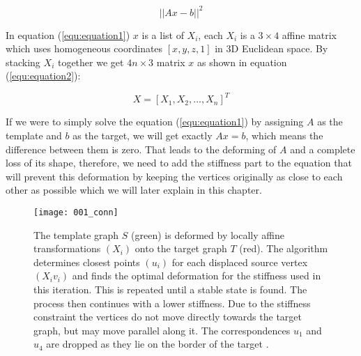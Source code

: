 \documentclass[../structure.tex]{subfiles}
\begin{document}
\begin{equation}
\label{equ:equation1}
||Ax-b||^2
\end{equation}

\hspace{2em}In equation (\ref{equ:equation1}) $x$ is a list of $X_i$, each $X_i$ is a $3\times4$ affine matrix which uses homogeneous coordinates $[x,y,z,1]$ in 3D Euclidean space. By stacking $X_i$ together we get $4n\times3$ matrix $x$ as shown in equation (\ref{equ:equation2}):

\begin{equation}
\label{equ:equation2}
X = [X_1, X_2, ... ,X_n]^T
\end{equation}

If we were to simply solve the equation (\ref{equ:equation1}) by assigning $A$ as the template and $b$ as the target, we will get exactly $Ax=b$, which means the difference between them is zero. That leads to the deforming of $A$ and a complete loss of its shape, therefore, we need to add the stiffness part to the equation that will prevent this deformation by keeping the vertices originally as close to each other as possible which we will later explain in this chapter.

\begin{figure}[h]
\centering
\texttt{[image: 001\_conn]}
\captionsetup{justification=centering}
\caption{The template graph $S$ (green) is deformed by locally affine transformations $(X_{i})$ onto the target graph $T$ (red). The algorithm determines closest points $(u_{i})$ for each displaced source vertex $(X_{i}v_{i})$ and finds the optimal deformation for the stiffness used in this iteration. This is repeated until a stable state is found. The process then continues with a lower stiffness. Due to the stiffness constraint the vertices do not move directly towards the target graph, but may move parallel along it. The correspondences $u_{1}$
and $u_{4}$ are dropped as they lie on the border of the target \cite{Amberg2007}.}
\label{fig:figure1}
\end{figure}
\end{document}
